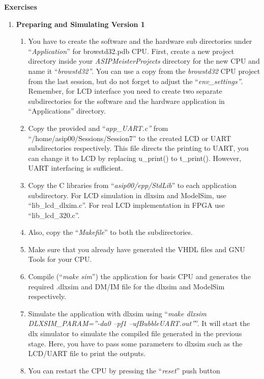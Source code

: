 \documentclass[
]{article}
\begin{document}
\textbf{Exercises}

\begin{enumerate}
\def\labelenumi{\arabic{enumi}.}
\item
  \textbf{Preparing and Simulating Version 1}

  \begin{enumerate}
  \def\labelenumii{\arabic{enumii}.}
  \item
    You have to create the software and the hardware sub directories
    under ``\emph{Application}'' for browstd32.pdb CPU. First, create a
    new project directory inside your \emph{ASIPMeisterProjects}
    directory for the new CPU and name it ``\emph{browstd32''}. You can
    use a copy from the \emph{browstd32} CPU project from the last
    session, but do not forget to adjust the ``\emph{env\_settings''}.
    Remember, for LCD interface you need to create two separate
    subdirectories for the software and the hardware application in
    ``Applications'' directory.
  \item
    Copy the provided and ``\emph{app\_UART.c''} from
    ``/home/asip00/Sessions/Session7'' to the created LCD or UART
    subdirectories respectively. This file directs the printing to UART,
    you can change it to LCD by replacing u\_print() to t\_print().
    However, UART interfacing is sufficient.
  \item
    Copy the C libraries from ``\emph{asip00/epp/StdLib}'' to each
    application subdirectory. For LCD simulation in dlxsim and ModelSim,
    use ``lib\_lcd\_dlxim.c''. For real LCD implementation in FPGA use
    ``lib\_lcd\_320.c''.
  \item
    Also, copy the ``\emph{Makefile}'' to both the subdirectories.
  \item
    Make sure that you already have generated the VHDL files and GNU
    Tools for your CPU.
  \item
    Compile (``\emph{make sim}'') the application for basis CPU and
    generates the required .dlxsim and DM/IM file for the dlxsim and
    ModelSim respectively.
  \item
    Simulate the application with dlxsim using ``\emph{make dlxsim
    DLXSIM\_PARAM=''-da0 --pf1 --ufBubbleUART.out''}''. It will start
    the dlx simulator to simulate the compiled file generated in the
    previous stage. Here, you have to pass some parameters to dlxsim
    such as the LCD/UART file to print the outputs.
  \item
    You can restart the CPU by pressing the ``\emph{reset}'' push button

\end{enumerate}
\end{enumerate}
\end{document}
